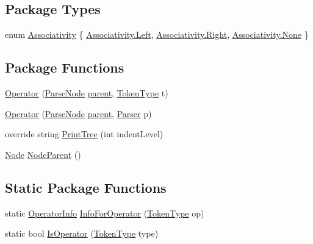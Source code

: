 \subsection*{Package Types}
\begin{DoxyCompactItemize}
\item 
enum \hyperlink{a00058_a83fa1b8db0e6678006920812b6f33f62}{Associativity} \{ \hyperlink{a00058_a83fa1b8db0e6678006920812b6f33f62a945d5e233cf7d6240f6b783b36a374ff}{Associativity.\-Left}, 
\hyperlink{a00058_a83fa1b8db0e6678006920812b6f33f62a92b09c7c48c520c3c55e497875da437c}{Associativity.\-Right}, 
\hyperlink{a00058_a83fa1b8db0e6678006920812b6f33f62a6adf97f83acf6453d4a6a4b1070f3754}{Associativity.\-None}
 \}
\end{DoxyCompactItemize}
\subsection*{Package Functions}
\begin{DoxyCompactItemize}
\item 
\hyperlink{a00058_a91a9fcc02c55cbc107fe2687fc0f05d4}{Operator} (\hyperlink{a00063}{Parse\-Node} \hyperlink{a00063_af313a82103fcc2ff5a177dbb06b92f7b}{parent}, \hyperlink{a00026_a301aa7c866593a5b625a8fc158bbeace}{Token\-Type} t)
\item 
\hyperlink{a00058_a50f9f95cd7aefe2a601a7d5b5ee7801a}{Operator} (\hyperlink{a00063}{Parse\-Node} \hyperlink{a00063_af313a82103fcc2ff5a177dbb06b92f7b}{parent}, \hyperlink{a00064}{Parser} p)
\item 
override string \hyperlink{a00058_a0c2ad7c4d6837ffc7b5325bbb8330c51}{Print\-Tree} (int indent\-Level)
\item 
\hyperlink{a00054}{Node} \hyperlink{a00063_a580e520a29444fc23ac3660cbe514a09}{Node\-Parent} ()
\end{DoxyCompactItemize}
\subsection*{Static Package Functions}
\begin{DoxyCompactItemize}
\item 
static \hyperlink{a00059}{Operator\-Info} \hyperlink{a00058_a871e7b4652c48f456647d3950ac37531}{Info\-For\-Operator} (\hyperlink{a00026_a301aa7c866593a5b625a8fc158bbeace}{Token\-Type} op)
\item 
static bool \hyperlink{a00058_a77a9edf71f86263e1695869e69505007}{Is\-Operator} (\hyperlink{a00026_a301aa7c866593a5b625a8fc158bbeace}{Token\-Type} type)
\end{DoxyCompactItemize}
